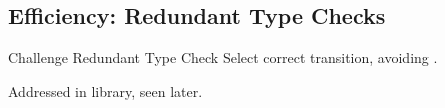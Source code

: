 \subsection{Efficiency: Redundant Type Checks}

{  %

\begin{frame}{Challenge }{Redundant Type Check}
  Select correct transition, avoiding .

  \medskip

  \scalebox{0.85}{}

  \medskip
  
  Addressed in  library, seen later.
\end{frame}
}


\newsavebox\typecaseAbox
\begin{lrbox}{\typecaseAbox}
  \begin{minipage}{8cm}
    
  \end{minipage}
\end{lrbox}

\newsavebox\typecaseITEbox
\begin{lrbox}{\typecaseITEbox}
  \begin{minipage}{8cm}
    
  \end{minipage}
\end{lrbox}

\newsavebox\typecaseITEafterbox
\begin{lrbox}{\typecaseITEafterbox}
  \begin{minipage}{8cm}

  \end{minipage}
\end{lrbox}

\newsavebox\typecaseBabox
\begin{lrbox}{\typecaseBabox}
  \begin{minipage}{8cm}

  \end{minipage}
\end{lrbox}

\newsavebox\typecaseBbox
\begin{lrbox}{\typecaseBbox}
  \begin{minipage}{8cm}
    
  \end{minipage}
\end{lrbox}


